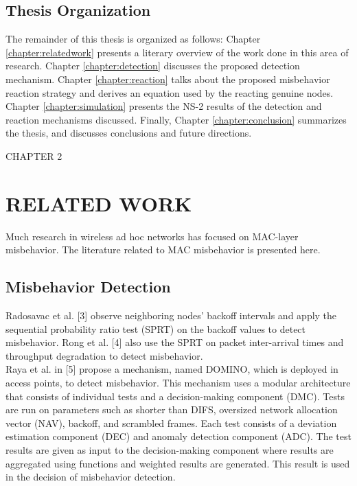 \documentclass[12pt,letterpaper,english]{article}
\begin{document}
\subsection{Thesis Organization}
\indent The remainder of this thesis is organized as follows: Chapter \ref{chapter:relatedwork} presents a literary overview of the work done in this area of research. Chapter \ref{chapter:detection} discusses the proposed detection mechanism. Chapter \ref{chapter:reaction} talks about the proposed misbehavior reaction strategy and derives an equation used by the reacting genuine nodes. Chapter \ref{chapter:simulation} presents the NS-2 results of the detection and reaction mechanisms discussed. Finally, Chapter \ref{chapter:conclusion} summarizes the thesis, and discusses conclusions and future directions.
\newpage
\setcounter{table}{0}
\setcounter{figure}{0}
\setcounter{subsection}{0}
\begin{singlespace}
\begin{center}
CHAPTER 2
\section*{RELATED WORK}
\addtocounter{section}{1}
\label{chapter:relatedwork}
\end{center}
\end{singlespace}
\indent Much research in wireless ad hoc networks has focused on MAC-layer misbehavior. The literature related to MAC misbehavior is presented here.
\subsection{Misbehavior Detection}
\indent Radosavac et al. 
[3] 
observe neighboring nodes' backoff intervals and apply the sequential probability ratio test (SPRT) on the backoff values to detect misbehavior. 
Rong et al. 
[4]
also use the SPRT on packet inter-arrival times and throughput degradation to detect misbehavior.
\\
\indent Raya et al. in 
[5] 
propose a mechanism, named DOMINO, which is deployed in access points, to detect misbehavior. This mechanism uses a modular architecture that consists of individual tests and a decision-making component (DMC). Tests are run on parameters such as shorter than DIFS, oversized network allocation vector (NAV), backoff, and scrambled frames. Each test consists of a deviation estimation component (DEC) and anomaly detection component (ADC). The test results are given as input to the decision-making component where results are aggregated using functions and weighted results are generated. This result is used in the decision of misbehavior detection.
\end{document}
